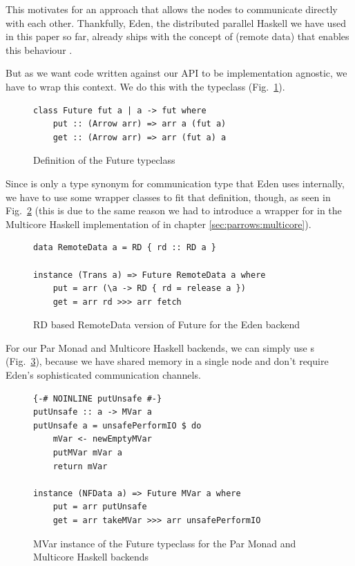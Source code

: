 This motivates for an approach that allows the nodes to communicate directly with each other. Thankfully, Eden, the distributed parallel Haskell we have used in this paper so far, already ships with the concept of  (remote data) that enables this behaviour \cite{AlGo03a,Dieterle2010}.

But as we want code written against our API to be implementation agnostic, we have to wrap this context. We do this with the  typeclass (Fig.~\ref{fig:future}).
\begin{figure}[h]
\begin{lstlisting}[frame=htrbl]
class Future fut a | a -> fut where
    put :: (Arrow arr) => arr a (fut a)
    get :: (Arrow arr) => arr (fut a) a
\end{lstlisting}
\caption{Definition of the Future typeclass}
\label{fig:future}
\end{figure}
Since  is only a type synonym for communication type that Eden uses internally, we have to use some wrapper classes to fit that definition, though, as seen in Fig.~\ref{fig:RDFuture} (this is due to the same reason we had to introduce a wrapper for  in the Multicore Haskell implementation of  in chapter \ref{sec:parrows:multicore}).
\begin{figure}[h]
\begin{lstlisting}[frame=htrbl]
data RemoteData a = RD { rd :: RD a }

instance (Trans a) => Future RemoteData a where
    put = arr (\a -> RD { rd = release a })
    get = arr rd >>> arr fetch
\end{lstlisting}
\caption{RD based RemoteData version of Future for the Eden backend}
\label{fig:RDFuture}
\end{figure}

For our Par Monad and Multicore Haskell backends, we can simply use s \cite{jones1996concurrent} (Fig.~\ref{fig:MVarFuture}), because we have shared memory in a single node and don't require Eden's sophisticated communication channels. 
\begin{figure}[h]
\begin{lstlisting}[frame=htrbl]
{-# NOINLINE putUnsafe #-}
putUnsafe :: a -> MVar a
putUnsafe a = unsafePerformIO $ do
    mVar <- newEmptyMVar
    putMVar mVar a
    return mVar

instance (NFData a) => Future MVar a where
    put = arr putUnsafe
    get = arr takeMVar >>> arr unsafePerformIO
\end{lstlisting}
\caption{MVar instance of the Future typeclass for the Par Monad and Multicore Haskell backends}
\label{fig:MVarFuture}
\end{figure}

